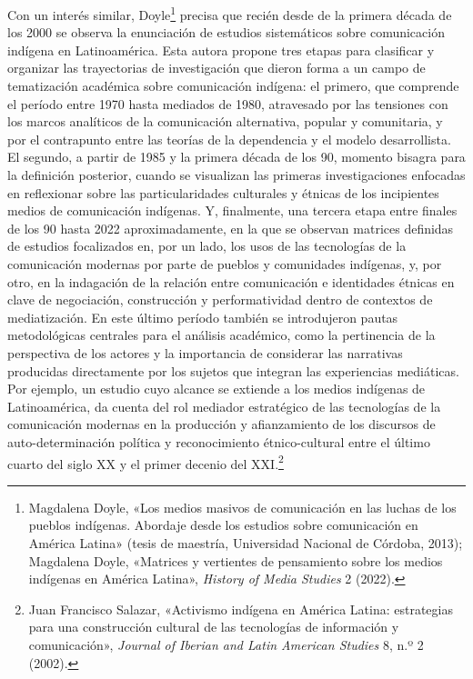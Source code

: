 \documentclass{tufte-handout}
\begin{document}
Con un interés similar, Doyle\footnote{Magdalena Doyle, «Los medios
  masivos de comunicación en las luchas de los pueblos indígenas.
  Abordaje desde los estudios sobre comunicación en América Latina»
  (tesis de maestría, Universidad Nacional de Córdoba, 2013); Magdalena
  Doyle, «Matrices y vertientes de pensamiento sobre los medios
  indígenas en América Latina», \emph{History of Media Studies} 2
  (2022).} precisa que recién desde de la primera década de los 2000 se
observa la enunciación de estudios sistemáticos sobre comunicación
indígena en Latinoamérica. Esta autora propone tres etapas para
clasificar y organizar las trayectorias de investigación que dieron
forma a un campo de tematización académica sobre comunicación indígena:
el primero, que comprende el período entre 1970 hasta mediados de 1980,
atravesado por las tensiones con los marcos analíticos de la
comunicación alternativa, popular y comunitaria, y por el contrapunto
entre las teorías de la dependencia y el modelo desarrollista. El
segundo, a partir de 1985 y la primera década de los 90, momento bisagra
para la definición posterior, cuando se visualizan las primeras
investigaciones enfocadas en reflexionar sobre las particularidades
culturales y étnicas de los incipientes medios de comunicación
indígenas. Y, finalmente, una tercera etapa entre finales de los 90
hasta 2022 aproximadamente, en la que se observan matrices definidas de
estudios focalizados en, por un lado, los usos de las tecnologías de la
comunicación modernas por parte de pueblos y comunidades indígenas, y,
por otro, en la indagación de la relación entre comunicación e
identidades étnicas en clave de negociación, construcción y
performatividad dentro de contextos de mediatización. En este último
período también se introdujeron pautas metodológicas centrales para el
análisis académico, como la pertinencia de la perspectiva de los actores
y la importancia de considerar las narrativas producidas directamente
por los sujetos que integran las experiencias mediáticas. Por ejemplo,
un estudio cuyo alcance se extiende a los medios indígenas de
Latinoamérica, da cuenta del rol mediador estratégico de las tecnologías
de la comunicación modernas en la producción y afianzamiento de los
discursos de auto-determinación política y reconocimiento
étnico-cultural entre el último cuarto del siglo XX y el primer decenio
del XXI.\footnote{Juan Francisco Salazar, «Activismo indígena en América
  Latina: estrategias para una construcción cultural de las tecnologías
  de información y comunicación», \emph{Journal of Iberian and Latin
  American Studies} 8, n.º 2 (2002).}
\end{document}
